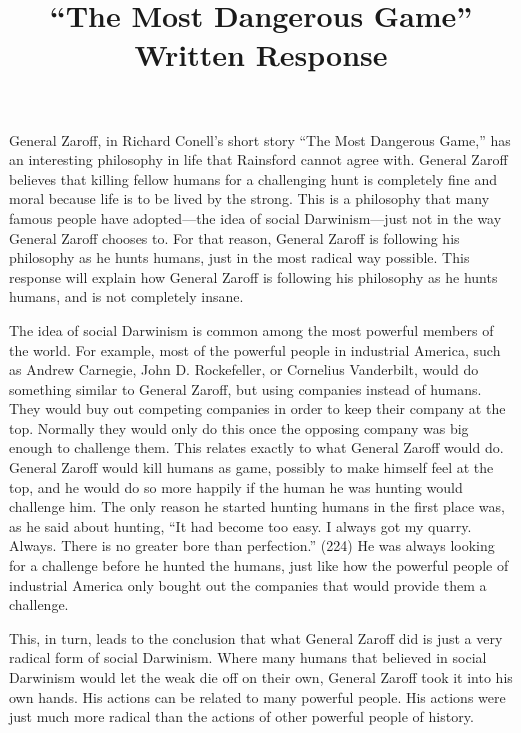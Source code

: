 \documentclass[12pt,letterpaper]{article}
\title{``The Most Dangerous Game'' Written Response}
\begin{document}
  
  General Zaroff, in Richard Conell's short story ``The Most Dangerous Game,'' has an interesting philosophy in life that Rainsford cannot agree with.
  General Zaroff believes that killing fellow humans for a challenging hunt is completely fine and moral because life is to be lived by the strong.
  This is a philosophy that many famous people have adopted---the idea of social Darwinism---just not in the way General Zaroff chooses to.
  For that reason, General Zaroff is following his philosophy as he hunts humans, just in the most radical way possible.
  This response will explain how General Zaroff is following his philosophy as he hunts humans, and is not completely insane.
  
  The idea of social Darwinism is common among the most powerful members of the world.
  For example, most of the powerful people in industrial America, such as Andrew Carnegie, John D. Rockefeller, or Cornelius Vanderbilt, would do something similar to General Zaroff, but using companies instead of humans.
  They would buy out competing companies in order to keep their company at the top.
  Normally they would only do this once the opposing company was big enough to challenge them.
  This relates exactly to what General Zaroff would do.  General Zaroff would kill humans as game, possibly to make himself feel at the top, and he would do so more happily if the human he was hunting would challenge him.
  The only reason he started hunting humans in the first place was, as he said about hunting, ``It had become too easy.
  I always got my quarry.
  Always.
  There is no greater bore than perfection.'' (224)
  He was always looking for a challenge before he hunted the humans, just like how the powerful people of industrial America only bought out the companies that would provide them a challenge.

  This, in turn, leads to the conclusion that what General Zaroff did is just a very radical form of social Darwinism.
  Where many humans that believed in social Darwinism would let the weak die off on their own, General Zaroff took it into his own hands.
  His actions can be related to many powerful people.
  His actions were just much more radical than the actions of other powerful people of history.
\end{document}
